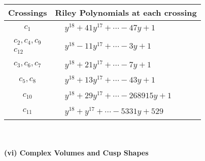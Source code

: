\documentclass[1p]{elsarticle_modified}
\theoremstyle{definition}
\begin{document}
\begin{tabular}{m{50pt}|m{274pt}}
Crossings & \hspace{64pt}Riley Polynomials at each crossing \\
\hline $$\begin{aligned}c_{1}\end{aligned}$$&$\begin{aligned}
&y^{18}+41 y^{17}+\cdots-47 y+1
\end{aligned}$\\
\hline $$\begin{aligned}c_{2},c_{4},c_{9}\\c_{12}\end{aligned}$$&$\begin{aligned}
&y^{18}-11 y^{17}+\cdots-3 y+1
\end{aligned}$\\
\hline $$\begin{aligned}c_{3},c_{6},c_{7}\end{aligned}$$&$\begin{aligned}
&y^{18}+21 y^{17}+\cdots-7 y+1
\end{aligned}$\\
\hline $$\begin{aligned}c_{5},c_{8}\end{aligned}$$&$\begin{aligned}
&y^{18}+13 y^{17}+\cdots-43 y+1
\end{aligned}$\\
\hline $$\begin{aligned}c_{10}\end{aligned}$$&$\begin{aligned}
&y^{18}+29 y^{17}+\cdots-268915 y+1
\end{aligned}$\\
\hline $$\begin{aligned}c_{11}\end{aligned}$$&$\begin{aligned}
&y^{18}+y^{17}+\cdots-5331 y+529
\end{aligned}$\\
\hline
\end{tabular}\\~\\
\newpage\flushleft \textbf{(vi) Complex Volumes and Cusp Shapes}
\end{document}
